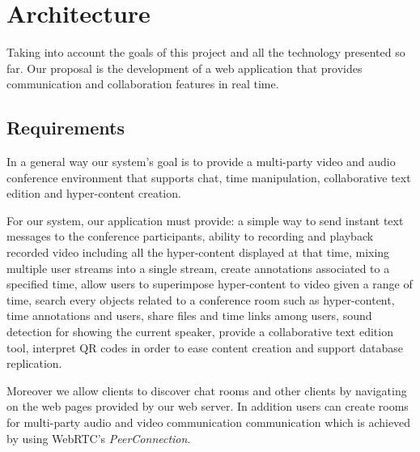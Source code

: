 \documentclass[conference,compsoc,a4paper]{IEEEtran}
\begin{document}
\section{Architecture}
\label{chapter:architecture}

Taking into account the goals of this project and all the technology presented so far. Our proposal is the development of a web application that provides communication and collaboration features in real time.

\subsection{Requirements}
In a general way our system's goal is to provide a multi-party video and audio conference environment that supports chat, time manipulation, collaborative text edition and hyper-content creation.


For our system, our application must provide: a simple way to send instant text messages to the conference participants, ability to recording and playback recorded video including all the hyper-content displayed at that time, mixing multiple user streams into a single stream, create annotations associated to a specified time, allow users to superimpose hyper-content to video given a range of time, search every objects related to a conference room such as hyper-content, time annotations and users, share files and time links among users, sound detection for showing the current speaker, provide a collaborative text edition tool, interpret \gls{QR} codes in order to ease content creation and support database replication.

	Moreover we allow clients to discover chat rooms and other clients by navigating on the web pages provided by our web server. In addition users can create rooms for multi-party audio and video communication communication which is achieved by using \gls{WebRTC}'s \emph{PeerConnection}.
        
\end{document}
